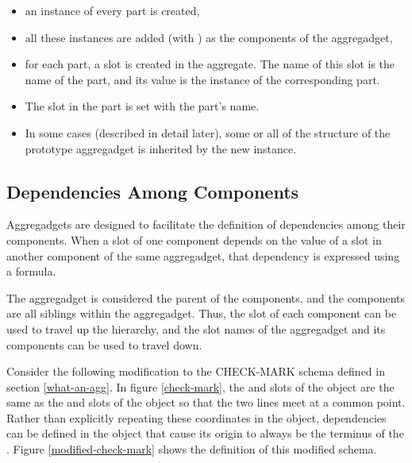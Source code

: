 \begin{itemize}
\item an instance of every part is created,

\item all these instances are added (with ) as the components
of the aggregadget,

\item for each part, a slot is created in the aggregate. The name of this slot is
the name of the part, and its value is the instance of the corresponding
part.

\item The slot  in the part is set with the part's name.

\item In some cases (described in detail later), some or all of the
structure of the prototype aggregadget is inherited by the new instance.
\end{itemize}


\subsection{Dependencies Among Components}
\label{agg-dependencies}

Aggregadgets are designed to facilitate the definition of dependencies among
their components.  When a slot of one component depends on the value of a
slot in another component of the same aggregadget, that dependency is
expressed using a formula.

The aggregadget is considered the parent of
the components, and the components are all siblings within the aggregadget.
Thus, the  slot of each component can be used to travel up the
hierarchy, and the slot names of the aggregadget and its components can be
used to travel down.

Consider the following modification to the CHECK-MARK schema
defined in section \ref{what-an-agg}.  In figure \ref{check-mark}, the
 and  slots of the  object are the same as
the  and  slots of the  object so that
the two lines meet at a common point.  Rather than explicitly
repeating these coordinates in the  object, dependencies
can be defined in the  object that cause its origin to always
be the terminus of the .  Figure \ref{modified-check-mark}
shows the definition of this modified schema.

